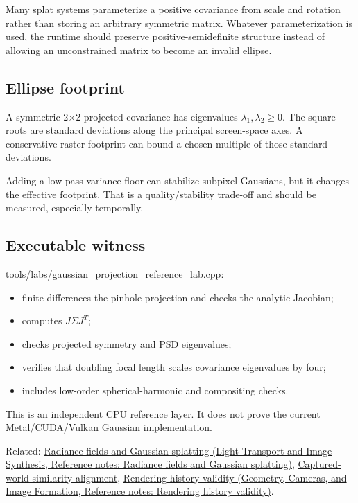 Many splat systems parameterize a positive covariance from scale and rotation rather than storing an arbitrary symmetric matrix. Whatever parameterization is used, the runtime should preserve positive-semidefinite structure instead of allowing an unconstrained matrix to become an invalid ellipse.

\subsection{Ellipse footprint}\label{appendix-24269cb6977c-ellipse-footprint}

A symmetric 2×2 projected covariance has eigenvalues \(\lambda_1,\lambda_2\ge0\). The square roots are standard deviations along the principal screen-space axes. A conservative raster footprint can bound a chosen multiple of those standard deviations.

Adding a low-pass variance floor can stabilize subpixel Gaussians, but it changes the effective footprint. That is a quality/stability trade-off and should be measured, especially temporally.

\subsection{Executable witness}\label{appendix-24269cb6977c-executable-witness}

tools/labs/gaussian\_projection\_reference\_lab.cpp:

\begin{itemize}
\tightlist
\item
  finite-differences the pinhole projection and checks the analytic Jacobian;
\item
  computes \(J\Sigma J^T\);
\item
  checks projected symmetry and PSD eigenvalues;
\item
  verifies that doubling focal length scales covariance eigenvalues by four;
\item
  includes low-order spherical-harmonic and compositing checks.
\end{itemize}

This is an independent CPU reference layer. It does not prove the current Metal/CUDA/Vulkan Gaussian implementation.

Related: \href{../04-Light-Transport-and-Image-Synthesis/main.pdf\#nameddest=appendix-c5b332e400e7}{Radiance fields and Gaussian splatting (Light Transport and Image Synthesis, Reference notes: Radiance fields and Gaussian splatting)}, \hyperref[appendix-5f40b4fea463]{Captured-world similarity alignment}, \href{../03-Geometry-Cameras-and-Image-Formation/main.pdf\#nameddest=appendix-2e7e9fd28a2c}{Rendering history validity (Geometry, Cameras, and Image Formation, Reference notes: Rendering history validity)}.


